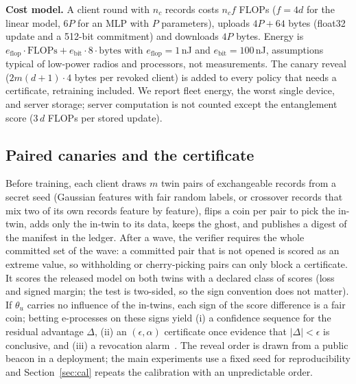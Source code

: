\documentclass[journal]{IEEEtran}
\begin{document}
\textbf{Cost model.} A client round with $n_c$ records costs $n_c f$ FLOPs ($f=4d$ for the linear model, $6P$ for an MLP with $P$ parameters), uploads $4P+64$ bytes (float32 update and a 512-bit commitment) and downloads $4P$ bytes. Energy is $e_{\text{flop}}\cdot\text{FLOPs}+e_{\text{bit}}\cdot 8\cdot\text{bytes}$ with $e_{\text{flop}}=1$\,nJ and $e_{\text{bit}}=100$\,nJ, assumptions typical of low-power radios and processors, not measurements. The canary reveal ($2m(d{+}1)\cdot4$ bytes per revoked client) is added to every policy that needs a certificate, retraining included. We report fleet energy, the worst single device, and server storage; server computation is not counted except the entanglement score ($3\,d$ FLOPs per stored update).

\subsection{Paired canaries and the certificate}
Before training, each client draws $m$ twin pairs of exchangeable records from a secret seed (Gaussian features with fair random labels, or crossover records that mix two of its own records feature by feature), flips a coin per pair to pick the in-twin, adds only the in-twin to its data, keeps the ghost, and publishes a digest of the manifest in the ledger. After a wave, the verifier requires the whole committed set of the wave: a committed pair that is not opened is scored as an extreme value, so withholding or cherry-picking pairs can only block a certificate. It scores the released model on both twins with a declared class of scores (loss and signed margin; the test is two-sided, so the sign convention does not matter). If $\theta_u$ carries no influence of the in-twins, each sign of the score difference is a fair coin; betting e-processes on these signs yield (i) a confidence sequence for the residual advantage $\Delta$, (ii) an $(\epsilon,\alpha)$ certificate once evidence that $|\Delta|<\epsilon$ is conclusive, and (iii) a revocation alarm~\cite{dang2026vouch}. The reveal order is drawn from a public beacon in a deployment; the main experiments use a fixed seed for reproducibility and Section~\ref{sec:cal} repeats the calibration with an unpredictable order.
\end{document}
